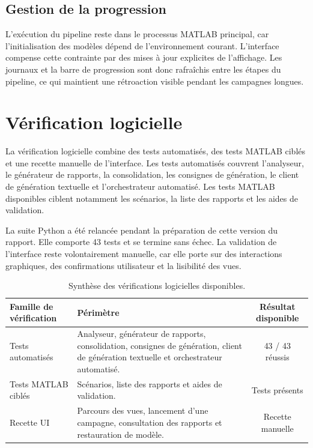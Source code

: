 \subsection{Gestion de la progression}
\label{subsec:ch5_progression_ui}

L'exécution du pipeline reste dans le processus MATLAB principal, car l'initialisation des modèles dépend de l'environnement courant. L'interface compense cette contrainte par des mises à jour explicites de l'affichage. Les journaux et la barre de progression sont donc rafraîchis entre les étapes du pipeline, ce qui maintient une rétroaction visible pendant les campagnes longues.

\section{Vérification logicielle}
\label{sec:ch5_verification_logicielle}

La vérification logicielle combine des tests automatisés, des tests MATLAB ciblés et une recette manuelle de l'interface. Les tests automatisés couvrent l'analyseur, le générateur de rapports, la consolidation, les consignes de génération, le client de génération textuelle et l'orchestrateur automatisé. Les tests MATLAB disponibles ciblent notamment les scénarios, la liste des rapports et les aides de validation.

\noindent
La suite Python a été relancée pendant la préparation de cette version du rapport. Elle comporte 43 tests et se termine sans échec. La validation de l'interface reste volontairement manuelle, car elle porte sur des interactions graphiques, des confirmations utilisateur et la lisibilité des vues.

\begin{table}[H]
  \centering
  \small
  \begin{tabularx}{\textwidth}{|l|X|c|}
    \hline
    \textbf{Famille de vérification} & \textbf{Périmètre} & \textbf{Résultat disponible} \\
    \hline
    Tests automatisés & Analyseur, générateur de rapports, consolidation, consignes de génération, client de génération textuelle et orchestrateur automatisé. & 43 / 43 réussis \\
    \hline
    Tests MATLAB ciblés & Scénarios, liste des rapports et aides de validation. & Tests présents \\
    \hline
    Recette UI & Parcours des vues, lancement d'une campagne, consultation des rapports et restauration de modèle. & Recette manuelle \\
    \hline
  \end{tabularx}
  \captionsetup{width=0.88\textwidth, skip=15pt}
  \caption{Synthèse des vérifications logicielles disponibles.}
  \label{tab:ch5_verification_logicielle}
\end{table}

